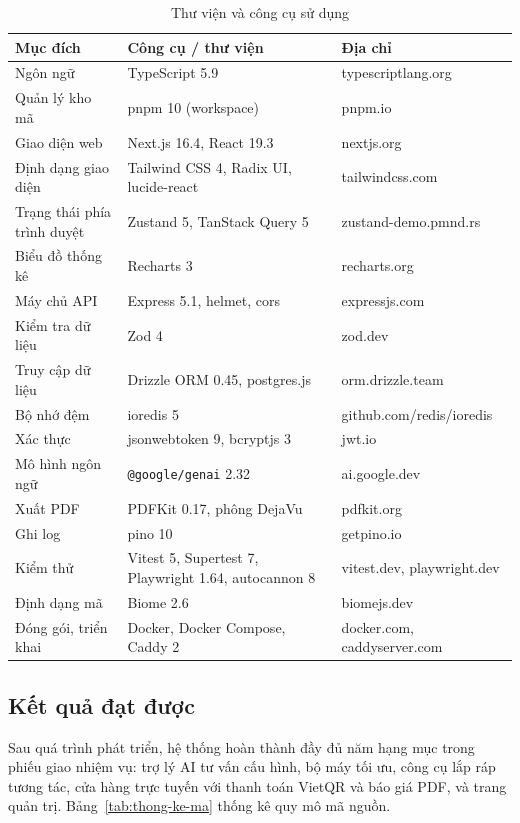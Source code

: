 \begin{table}[H]
\centering\small
\begin{tabular}{|L{4.6cm}|L{4.4cm}|L{4.8cm}|}
\hline
\textbf{Mục đích} & \textbf{Công cụ / thư viện} & \textbf{Địa chỉ} \\ \hline
Ngôn ngữ & TypeScript 5.9 & typescriptlang.org \\ \hline
Quản lý kho mã & pnpm 10 (workspace) & pnpm.io \\ \hline
Giao diện web & Next.js 16.4, React 19.3 & nextjs.org \\ \hline
Định dạng giao diện & Tailwind CSS 4, Radix UI, lucide-react & tailwindcss.com \\ \hline
Trạng thái phía trình duyệt & Zustand 5, TanStack Query 5 & zustand-demo.pmnd.rs \\ \hline
Biểu đồ thống kê & Recharts 3 & recharts.org \\ \hline
Máy chủ API & Express 5.1, helmet, cors & expressjs.com \\ \hline
Kiểm tra dữ liệu & Zod 4 & zod.dev \\ \hline
Truy cập dữ liệu & Drizzle ORM 0.45, postgres.js & orm.drizzle.team \\ \hline
Bộ nhớ đệm & ioredis 5 & github.com/redis/ioredis \\ \hline
Xác thực & jsonwebtoken 9, bcryptjs 3 & jwt.io \\ \hline
Mô hình ngôn ngữ & \texttt{@google/genai} 2.32 & ai.google.dev \\ \hline
Xuất PDF & PDFKit 0.17, phông DejaVu & pdfkit.org \\ \hline
Ghi log & pino 10 & getpino.io \\ \hline
Kiểm thử & Vitest 5, Supertest 7, Playwright 1.64, autocannon 8 & vitest.dev, playwright.dev \\ \hline
Định dạng mã & Biome 2.6 & biomejs.dev \\ \hline
Đóng gói, triển khai & Docker, Docker Compose, Caddy 2 & docker.com, caddyserver.com \\ \hline
\end{tabular}
\caption{Thư viện và công cụ sử dụng}
\label{tab:thu-vien}
\end{table}

\subsection{Kết quả đạt được}

Sau quá trình phát triển, hệ thống hoàn thành đầy đủ năm hạng mục trong phiếu giao nhiệm vụ: trợ lý AI tư vấn cấu hình, bộ máy tối ưu, công cụ lắp ráp tương tác, cửa hàng trực tuyến với thanh toán VietQR và báo giá PDF, và trang quản trị. Bảng~\ref{tab:thong-ke-ma} thống kê quy mô mã nguồn.

